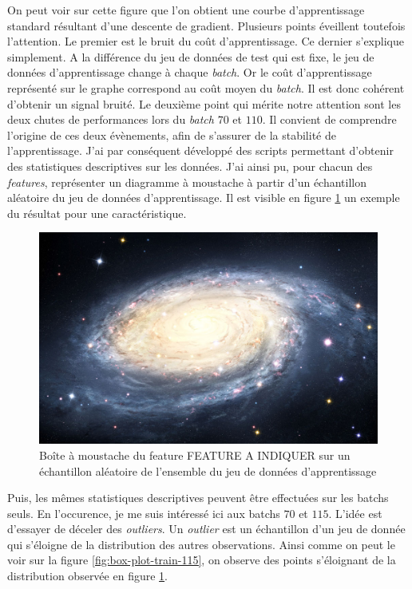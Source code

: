        On peut voir sur cette figure que l'on obtient une courbe d'apprentissage standard résultant d'une descente de gradient. Plusieurs points éveillent toutefois l'attention. Le premier est le bruit du coût d'apprentissage. Ce dernier s'explique simplement. A la différence du jeu de données de test qui est fixe, le jeu de données d'apprentissage change à chaque \emph{batch}. Or le coût d'apprentissage représenté sur le graphe correspond au coût moyen du \emph{batch}. Il est donc cohérent d'obtenir un signal bruité. Le deuxième point qui mérite notre attention sont les deux chutes de performances lors du \emph{batch} $70$ et $110$. Il convient de comprendre l'origine de ces deux évènements, afin de s'assurer de la stabilité de l'apprentissage. J'ai par conséquent développé des scripts permettant d'obtenir des statistiques descriptives sur les données. J'ai ainsi pu, pour chacun des \emph{features}, représenter un diagramme à moustache à partir d'un échantillon aléatoire du jeu de données d'apprentissage. Il est visible en figure \ref{fig:box-plot-train} un exemple du résultat pour une caractéristique. 
        \begin{figure}[h]
            \includegraphics[width=\linewidth]{images/universe.jpg}
            \caption{Boîte à moustache du feature FEATURE A INDIQUER sur un échantillon aléatoire de l'ensemble du jeu de données d'apprentissage}
            \label{fig:box-plot-train}
        \end{figure}
        Puis, les mêmes statistiques descriptives peuvent être effectuées sur les batchs seuls. En l'occurence, je me suis intéressé ici aux batchs $70$ et $115$. L'idée est d'essayer de déceler des \emph{outliers}. Un \emph{outlier} est un échantillon d'un jeu de donnée qui s'éloigne de la distribution des autres observations. Ainsi comme on peut le voir sur la figure \ref{fig:box-plot-train-115}, on observe des points s'éloignant de la distribution observée en figure \ref{fig:box-plot-train}.
